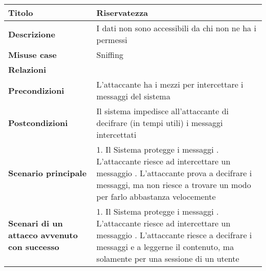 \begin{tabular} {|P{4cm}|P{11.5cm}|}
  \hline
  \textbf{Titolo}                                      & Riservatezza                                                    \\
  \hline
  \textbf{Descrizione}                                 & I dati non sono accessibili da chi non ne ha i permessi         \\
  \hline
  \textbf{Misuse case}                                 & Sniffing                                                        \\
  \hline
  \textbf{Relazioni}                                   &                                                                 \\
  \hline
  \textbf{Precondizioni}                               & L'attaccante ha i mezzi per intercettare i messaggi del sistema \\
  \hline
  \textbf{Postcondizioni}                              & Il sistema impedisce all'attaccante di decifrare
  (in tempi utili) i messaggi intercettati                                                                               \\
  \hline
  \textbf{Scenario principale}                         & 1. Il Sistema protegge i messaggi . L'attaccante riesce ad intercettare un messaggio . L'attaccante prova
  a decifrare i messaggi, ma non riesce a trovare un modo per farlo abbastanza
  velocemente                                                                                                            \\
  \hline
  \textbf{Scenari di un attacco avvenuto con successo} & 1. Il Sistema protegge
  i messaggi . L'attaccante riesce ad intercettare un messaggio . L'attaccante riesce a decifrare i messaggi e a leggerne il contenuto, ma
  solamente per una sessione di un utente                                                                                \\
  \hline
\end{tabular}
\hfill
\break

